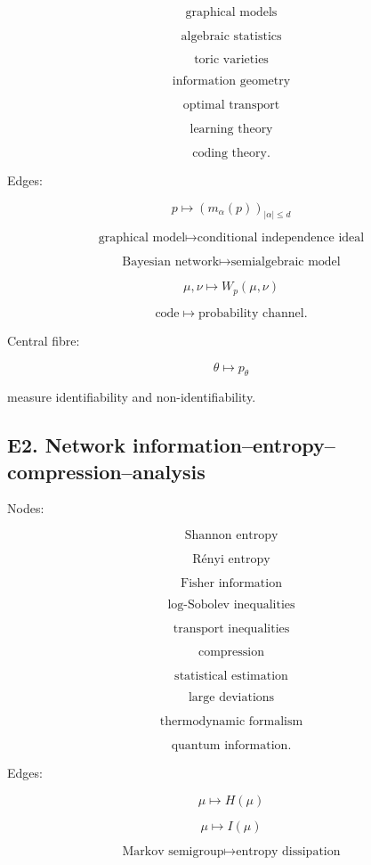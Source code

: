 \documentclass[11pt]{article}
\begin{document}
\[
\text{graphical models}
\]

\[
\text{algebraic statistics}
\]

\[
\text{toric varieties}
\]

\[
\text{information geometry}
\]

\[
\text{optimal transport}
\]

\[
\text{learning theory}
\]

\[
\text{coding theory}.
\]

Edges:

\[
p\mapsto (m_\alpha(p))_{|\alpha|\le d}
\]

\[
\text{graphical model}\mapsto \text{conditional independence ideal}
\]

\[
\text{Bayesian network}\mapsto \text{semialgebraic model}
\]

\[
\mu,\nu\mapsto W_p(\mu,\nu)
\]

\[
\text{code}\mapsto \text{probability channel}.
\]

Central fibre:

\[
\theta\mapsto p_\theta
\]

measure identifiability and non-identifiability.



\subsection{E2. Network information--entropy--compression--analysis}

Nodes:

\[
\text{Shannon entropy}
\]

\[
\text{Rényi entropy}
\]

\[
\text{Fisher information}
\]

\[
\text{log-Sobolev inequalities}
\]

\[
\text{transport inequalities}
\]

\[
\text{compression}
\]

\[
\text{statistical estimation}
\]

\[
\text{large deviations}
\]

\[
\text{thermodynamic formalism}
\]

\[
\text{quantum information}.
\]

Edges:

\[
\mu\mapsto H(\mu)
\]

\[
\mu\mapsto I(\mu)
\]

\[
\text{Markov semigroup}\mapsto \text{entropy dissipation}
\]
\end{document}
